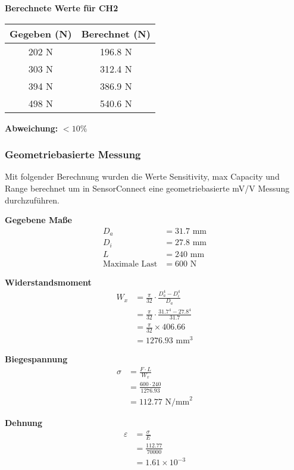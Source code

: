 \textbf{Berechnete Werte für CH2}
\begin{center}
\begin{tabular}{|c|c|}
\hline
\textbf{Gegeben (N)} & \textbf{Berechnet (N)} \\
\hline
202 N & 196.8 N \\
303 N & 312.4 N \\
394 N & 386.9 N \\
498 N & 540.6 N \\
\hline
\end{tabular}
\end{center}

\textbf{Abweichung:} $<10\%$

\subsubsection{Geometriebasierte Messung}
\label{sec:lenkerberechnung}
Mit folgender Berechnung wurden die Werte Sensitivity, max Capacity und Range berechnet um in SensorConnect eine geometriebasierte mV/V Messung durchzuführen.

\textbf{Gegebene Maße}
\begin{align*}
D_a &= 31.7 \text{ mm}  \\
D_i &= 27.8 \text{ mm}  \\
L &= 240 \text{ mm}  \\
\text{Maximale Last} &= 600 \text{ N}
\end{align*}

\textbf{Widerstandsmoment}
\begin{align*}
W_x &= \frac{\pi}{32} \cdot \frac{D_a^4 - D_i^4}{D_a} \\
    &= \frac{\pi}{32} \cdot \frac{31.7^4 - 27.8^4}{31.7} \\
    &= \frac{\pi}{32} \times 406.66 \\
    &= 1276.93 \text{ mm}^3
\end{align*}

\textbf{Biegespannung}
\begin{align*}
\sigma &= \frac{F \cdot L}{W_x} \\
       &= \frac{600 \cdot 240}{1276.93} \\
       &= 112.77 \text{ N/mm}^2
\end{align*}

\textbf{Dehnung}
\begin{align*}
\varepsilon &= \frac{\sigma}{E} \\
            &= \frac{112.77}{70000} \\
            &= 1.61 \times 10^{-3}
\end{align*}

